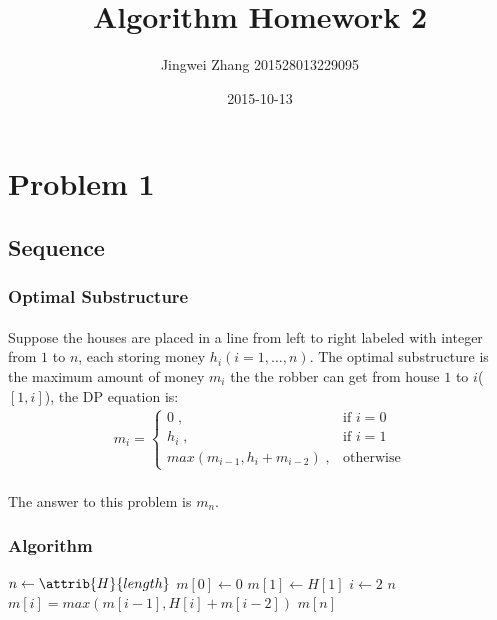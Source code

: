 \documentclass[]{article}
\title{Algorithm Homework 2}
\date{2015-10-13}
\author{Jingwei Zhang 201528013229095}
\begin{document}
    \maketitle
    \section{Problem 1}
        \subsection{Sequence}
            \subsubsection{Optimal Substructure}
                \paragraph{}Suppose the houses are placed in a line from left to right labeled with integer from $1$ to $n$, each storing money $h_i(i = 1,\dots,n)$. The optimal substructure is the maximum amount of money $m_i$ the the robber can get from house $1$ to $i$($[1, i]$), the DP equation is:
                \begin{align*}
                m_i = \begin{cases}
                     0 \;, & \text{if } i=0 \\
                     h_i \;, &\text{if } i=1 \\
                     max(m_{i-1}, h_i + m_{i-2}) \;, & \text{otherwise}
                     \end{cases}
                \end{align*}
               \paragraph{}The answer to this problem is $m_n$.
            \subsubsection{Algorithm}
            \begin{codebox}
\li $n \gets \attrib{H}{length}$
\li $m[0] \gets 0$
\li $m[1] \gets H[1]$
\li \For $i \gets 2$ \To $n$
\li     \Do
            $m[i] = max(m[i-1], H[i] + m[i-2])$
        \End 
\li \Return $m[n]$
            \end{codebox}
\end{document}
